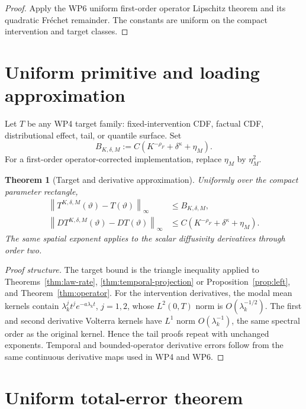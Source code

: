 \documentclass[11pt]{article}
\newtheorem{theorem}[assumption]{Theorem}
\theoremstyle{remark}
\newcommand{\norm}[1]{\left\lVert #1\right\rVert}
\begin{document}
\begin{proof}
Apply the WP6 uniform first-order operator Lipschitz theorem and its quadratic Fr\'echet remainder. The constants are uniform on the compact intervention and target classes.
\end{proof}

\section{Uniform primitive and loading approximation}

Let $T$ be any WP4 target family: fixed-intervention CDF, factual CDF, distributional effect, tail, or quantile surface. Set
\begin{equation}\label{eq:Bnum}
 B_{K,\delta,M}
 :=C\left(K^{-\rho_F}+\delta^\kappa+\eta_M\right).
\end{equation}
For a first-order operator-corrected implementation, replace $\eta_M$ by $\eta_M^2$.

\begin{theorem}[Target and derivative approximation]\label{thm:target-derivative}
Uniformly over the compact parameter rectangle,
\begin{align}
 \norm{T^{K,\delta,M}(\vartheta)-T(\vartheta)}_\infty
 &\le B_{K,\delta,M},
 \label{eq:target-num}\\
 \norm{DT^{K,\delta,M}(\vartheta)-DT(\vartheta)}_\infty
 &\le C\left(K^{-\rho_F}+\delta^\kappa+\eta_M\right).
 \label{eq:derivative-num}
\end{align}
The same spatial exponent applies to the scalar diffusivity derivatives through order two.
\end{theorem}

\begin{proof}[Proof structure]
The target bound is the triangle inequality applied to Theorems~\ref{thm:law-rate}, \ref{thm:temporal-projection} or Proposition~\ref{prop:left}, and Theorem~\ref{thm:operator}. For the intervention derivatives, the modal mean kernels contain $\lambda_k^jt^je^{-a\lambda_kt}$, $j=1,2$, whose $L^2(0,T)$ norm is $O(\lambda_k^{-1/2})$. The first and second derivative Volterra kernels have $L^1$ norm $O(\lambda_k^{-1})$, the same spectral order as the original kernel. Hence the tail proofs repeat with unchanged exponents. Temporal and bounded-operator derivative errors follow from the same continuous derivative maps used in WP4 and WP6.
\end{proof}

\section{Uniform total-error theorem}
\end{document}
